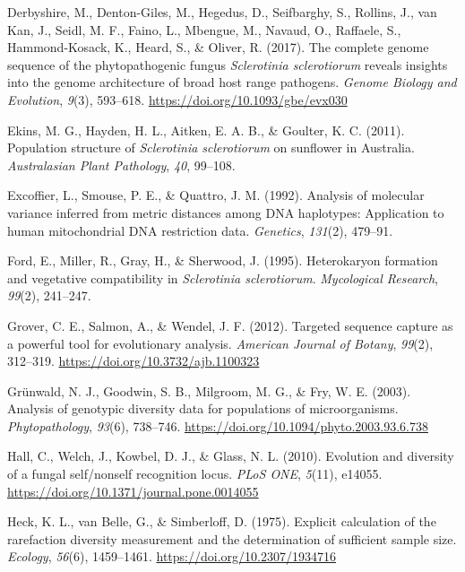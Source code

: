 \documentclass[fleqn,10pt,lineno]{wlpeerj} %
\theoremstyle{definition}
\theoremstyle{definition}
\theoremstyle{definition}
\theoremstyle{remark}
\begin{document}
\hypertarget{ref-derbyshire2017complete}{}
Derbyshire, M., Denton-Giles, M., Hegedus, D., Seifbarghy, S., Rollins,
J., van Kan, J., Seidl, M. F., Faino, L., Mbengue, M., Navaud, O.,
Raffaele, S., Hammond-Kosack, K., Heard, S., \& Oliver, R. (2017). The
complete genome sequence of the phytopathogenic fungus \emph{Sclerotinia
sclerotiorum} reveals insights into the genome architecture of broad
host range pathogens. \emph{Genome Biology and Evolution}, \emph{9}(3),
593--618. \url{https://doi.org/10.1093/gbe/evx030}

\hypertarget{ref-ekins2011population}{}
Ekins, M. G., Hayden, H. L., Aitken, E. A. B., \& Goulter, K. C. (2011).
Population structure of \emph{Sclerotinia sclerotiorum} on sunflower in
Australia. \emph{Australasian Plant Pathology}, \emph{40}, 99--108.

\hypertarget{ref-excoffier1992analysis}{}
Excoffier, L., Smouse, P. E., \& Quattro, J. M. (1992). Analysis of
molecular variance inferred from metric distances among DNA haplotypes:
Application to human mitochondrial DNA restriction data.
\emph{Genetics}, \emph{131}(2), 479--91.

\hypertarget{ref-ford1995heterokaryon}{}
Ford, E., Miller, R., Gray, H., \& Sherwood, J. (1995). Heterokaryon
formation and vegetative compatibility in \emph{Sclerotinia
sclerotiorum}. \emph{Mycological Research}, \emph{99}(2), 241--247.

\hypertarget{ref-grover2012targeted}{}
Grover, C. E., Salmon, A., \& Wendel, J. F. (2012). Targeted sequence
capture as a powerful tool for evolutionary analysis. \emph{American
Journal of Botany}, \emph{99}(2), 312--319.
\url{https://doi.org/10.3732/ajb.1100323}

\hypertarget{ref-grunwald2003analysis}{}
Grünwald, N. J., Goodwin, S. B., Milgroom, M. G., \& Fry, W. E. (2003).
Analysis of genotypic diversity data for populations of microorganisms.
\emph{Phytopathology}, \emph{93}(6), 738--746.
\url{https://doi.org/10.1094/phyto.2003.93.6.738}

\hypertarget{ref-hall2010evolution}{}
Hall, C., Welch, J., Kowbel, D. J., \& Glass, N. L. (2010). Evolution
and diversity of a fungal self/nonself recognition locus. \emph{PLoS
ONE}, \emph{5}(11), e14055.
\url{https://doi.org/10.1371/journal.pone.0014055}

\hypertarget{ref-heck1975explicit}{}
Heck, K. L., van Belle, G., \& Simberloff, D. (1975). Explicit
calculation of the rarefaction diversity measurement and the
determination of sufficient sample size. \emph{Ecology}, \emph{56}(6),
1459--1461. \url{https://doi.org/10.2307/1934716}
\end{document}
